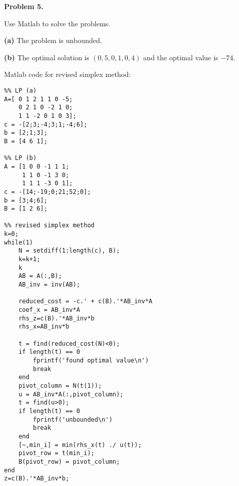 \documentclass[12pt]{article}
\begin{document}
\vspace{\baselineskip}
\noindent
\textbf{Problem 5.}

Use Matlab to solve the problems.

\noindent
\textbf{(a)} The problem is unbounded.

\noindent
\textbf{(b)} The optimal solution is $(0, 5, 0, 1, 0, 4)$ and the optimal value is $-74$.


Matlab code for revised simplex method:
\begin{lstlisting}
%% LP (a)
A=[ 0 1 2 1 1 0 -5;
    0 2 1 0 -2 1 0;
    1 1 -2 0 1 0 3];
c = -[2;3;-4;3;1;-4;6];
b = [2;1;3];
B = [4 6 1];

%% LP (b)
A = [1 0 0 -1 1 1;
     1 1 0 -1 3 0;
     1 1 1 -3 0 1];
c = -[14;-19;0;21;52;0];
b = [3;4;6];
B = [1 2 6];

%% revised simplex method
k=0;
while(1)
    N = setdiff(1:length(c), B);
    k=k+1;
    k
    AB = A(:,B);
    AB_inv = inv(AB);

    reduced_cost = -c.' + c(B).'*AB_inv*A
    coef_x = AB_inv*A
    rhs_z=c(B).'*AB_inv*b
    rhs_x=AB_inv*b

    t = find(reduced_cost(N)<0);
    if length(t) == 0
        fprintf('found optimal value\n')
        break
    end
    pivot_column = N(t(1));
    u = AB_inv*A(:,pivot_column);
    t = find(u>0);
    if length(t) == 0
        fprintf('unbounded\n')
        break
    end
    [~,min_i] = min(rhs_x(t) ./ u(t));
    pivot_row = t(min_i);
    B(pivot_row) = pivot_column;
end
z=c(B).'*AB_inv*b;
\end{lstlisting}

\end{document}
